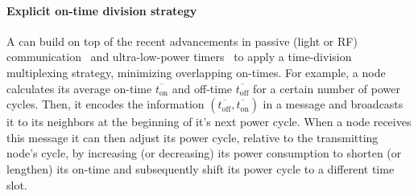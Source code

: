\paragraph{Explicit on-time division strategy}
A \cis can build on top of the recent advancements in passive (light or RF)
communication~\cite{liu2013ambient}
and ultra-low-power timers~\cite{hester2017timely} to apply a
time-division multiplexing strategy, minimizing overlapping on-times. For
example, a node calculates its average on-time $\overline{t_\text{on}}$
and off-time $\overline{t_\text{off}}$ for a certain number of power
cycles. Then, it encodes the information $({\overline{t_\text{off}},
\overline{t_\text{on}}})$ in a message and broadcasts it to its neighbors at
the beginning of it's next power cycle.
When a node receives this message 
it can then adjust
its power cycle, relative to the transmitting node's cycle, by increasing
(or decreasing) its power consumption to shorten (or lengthen) its
on-time and subsequently shift its power cycle to a different time slot.

